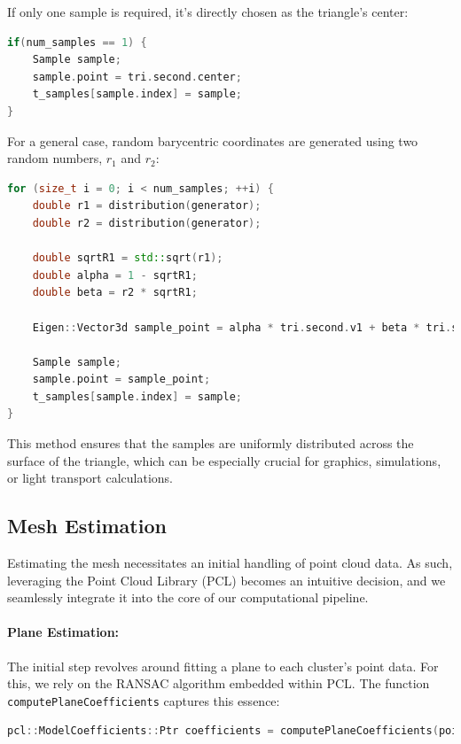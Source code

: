 \documentclass[11pt, a4paper,oneside,chapterprefix=false]{scrbook}
\begin{document}
If only one sample is required, it's directly chosen as the triangle's center:

\begin{lstlisting}[language=C++, caption=Triangle Center Sampling]
if(num_samples == 1) {
	Sample sample;
	sample.point = tri.second.center;
	t_samples[sample.index] = sample;
}
\end{lstlisting}

For a general case, random barycentric coordinates are generated using two random numbers, \( r_1 \) and \( r_2 \):

\begin{lstlisting}[language=C++, caption=Barycentric Coordinate Sampling]
for (size_t i = 0; i < num_samples; ++i) {
	double r1 = distribution(generator);
	double r2 = distribution(generator);

	double sqrtR1 = std::sqrt(r1);
	double alpha = 1 - sqrtR1;
	double beta = r2 * sqrtR1;

	Eigen::Vector3d sample_point = alpha * tri.second.v1 + beta * tri.second.v2 + (1 - alpha - beta) * tri.second.v3;

	Sample sample;
	sample.point = sample_point;
	t_samples[sample.index] = sample;
}
\end{lstlisting}

This method ensures that the samples are uniformly distributed across the surface of the triangle, which can be especially crucial for graphics, simulations, or light transport calculations.


\subsection{Mesh Estimation}\label{sec:mesh estimation}

Estimating the mesh necessitates an initial handling of point cloud data. As such, leveraging the Point Cloud Library (PCL) becomes an intuitive decision, and we seamlessly integrate it into the core of our computational pipeline.


\paragraph{Plane Estimation:} The initial step revolves around fitting a plane to each cluster's point data. For this, we rely on the RANSAC algorithm embedded within PCL. The function \texttt{computePlaneCoefficients} captures this essence:

\begin{lstlisting}[language=C++, caption=Estimating Plane Coefficients]
pcl::ModelCoefficients::Ptr coefficients = computePlaneCoefficients(points);
\end{lstlisting}
\end{document}
